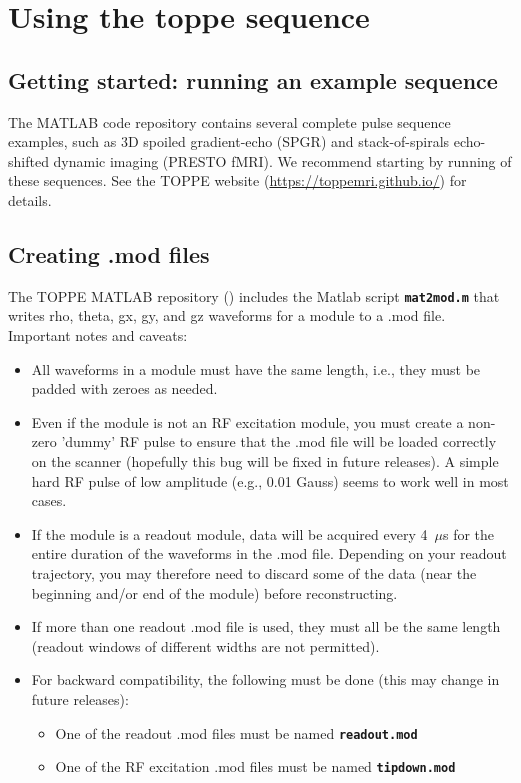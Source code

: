 
\chapter{Using the toppe sequence}

\section{Getting started: running an example sequence}

The MATLAB code repository contains several complete pulse sequence examples, such as 3D spoiled gradient-echo (SPGR) and stack-of-spirals echo-shifted dynamic imaging (PRESTO fMRI). 
We recommend starting by running of these sequences.
See the TOPPE website (\url{https://toppemri.github.io/}) for details.



\section{Creating .mod files}
The TOPPE MATLAB repository (\matrep) includes the Matlab script {\tt \bf mat2mod.m} that writes rho, theta, gx, gy, and gz waveforms for a module to a .mod file.
Important notes and caveats:
\begin{itemize}
\item All waveforms in a module must have the same length, i.e., they must be padded with zeroes as needed.
\item Even if the module is not an RF excitation module, you must create a non-zero 'dummy' RF pulse to ensure that the .mod file will be loaded correctly on the scanner (hopefully this bug will be fixed in future releases). A simple hard RF pulse of low amplitude (e.g., 0.01 Gauss) seems to work well in most cases.
\item If the module is a readout module, data will be acquired every 4~$\mu$s for the entire duration of the waveforms in the .mod file. Depending on your readout trajectory, you may therefore need to discard some of the data (near the beginning and/or end of the module) before reconstructing.
\item If more than one readout .mod file is used, they must all be the same length (readout windows of different widths are not permitted).
\item For backward compatibility, the following must be done (this may change in future releases):
\begin{itemize}
	\item One of the readout .mod files must be named {\tt \bf readout.mod} 
	\item One of the RF excitation .mod files must be named {\tt \bf tipdown.mod} 
\end{itemize}
\end{itemize}


